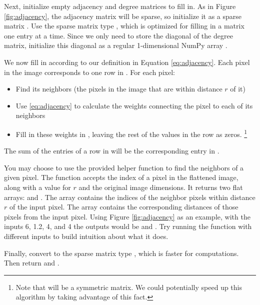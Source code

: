 Next, initialize empty adjacency and degree matrices to fill in. 
As in Figure \ref{fig:adjacency}, the adjacency matrix will be sparse, so initialize it as a sparse matrix . 
Use the sparse matrix type , which is optimized for filling in a matrix one entry at a time. 
Since we only need to store the diagonal of the degree matrix, initialize this diagonal as a regular 1-dimensional NumPy array .

We now fill in  according to our definition in Equation \ref{eq:adjacency}.
Each pixel in the image corresponds to one row in .
For each pixel:
\begin{itemize}
\item Find its neighbors (the pixels in the image that are within distance $r$ of it)
\item Use \ref{eq:adjacency} to calculate the weights connecting the pixel to each of its neighbors
\item Fill in these weights in , leaving the rest of the values in the row as zeros. \footnote{Note that  will be a symmetric matrix. We could potentially speed up this algorithm by taking advantage of this fact.}
\end{itemize} 
The sum of the entries of a row in  will be the corresponding entry in . 

You may choose to use the provided helper function  to find the neighbors of a given pixel.
The function accepts the index of a pixel in the flattened image, along with a value for $r$ and the original image dimensions. 
It returns two flat arrays:  and . 
The array  contains the indices of the neighbor pixels within distance $r$ of the input pixel. 
The array  contains the corresponding distances of those pixels from the input pixel.
Using Figure \ref{fig:adjacency} as an example, with the inputs 6, 1.2, 4, and 4 the outputs would be  and . 
Try running the function with different inputs to build intuition about what it does.

Finally, convert  to the sparse matrix type , which is faster for computations. Then return  and .

